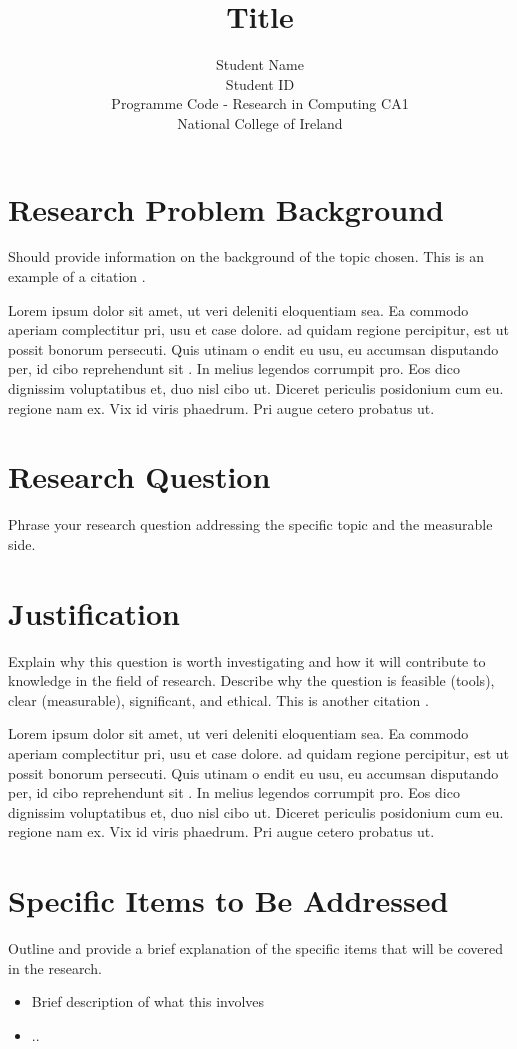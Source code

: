 \documentclass{article}
\title{Title \\ [Area]}
\author{Student Name \\ Student ID \\ Programme Code - Research in Computing CA1 \\ National College of Ireland}
\date{}
\begin{document}
\maketitle

\section{Research Problem Background}
Should provide information on the background of the topic chosen.  This is an example of a citation \cite{adams1995hitchhiker}.

Lorem ipsum dolor sit amet, ut veri deleniti eloquentiam sea. Ea commodo aperiam complectitur pri, usu et case dolore. \cite{gomes2015introduction} ad quidam regione percipitur, est ut possit bonorum persecuti. Quis utinam o endit eu usu, eu accumsan disputando per, id cibo reprehendunt sit \cite{kune2016anatomy}. In melius legendos corrumpit pro. Eos dico dignissim voluptatibus et, duo nisl cibo ut. Diceret periculis posidonium cum eu.  regione nam ex. Vix id viris phaedrum. Pri augue cetero probatus ut.

\section{Research Question}
Phrase your research question addressing the specific topic and the measurable side.

\section{Justification}
Explain why this question is worth investigating and how it will contribute to knowledge in the field of research. Describe why the question is feasible (tools), clear (measurable), significant, and ethical. This is another citation \cite{feng2016maximum}. 

Lorem ipsum dolor sit amet, ut veri deleniti eloquentiam sea. Ea commodo aperiam complectitur pri, usu et case dolore. \cite{gomes2015introduction} ad quidam regione percipitur, est ut possit bonorum persecuti. Quis utinam o endit eu usu, eu accumsan disputando per, id cibo reprehendunt sit \cite{kune2016anatomy}. In melius legendos corrumpit pro. Eos dico dignissim voluptatibus et, duo nisl cibo ut. Diceret periculis posidonium cum eu.  regione nam ex. Vix id viris phaedrum. Pri augue cetero probatus ut.


\section{Specific Items to Be Addressed}
Outline and provide a brief explanation of the specific items that will be covered in the research.
\begin{itemize}
    \item[Item \#1] Brief description of what this involves 
    \item[Item \#2] ..
\end{itemize}





\end{document}
